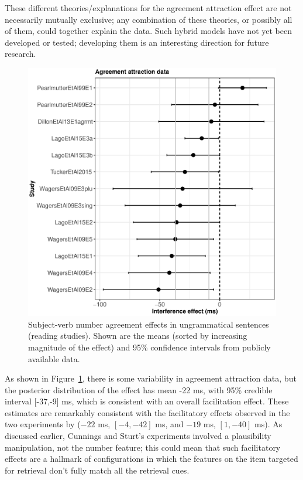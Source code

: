 \documentclass{cambridge7A}\usepackage[]{graphicx}\usepackage[]{color}
\makeatletter
\def\maxwidth{ %
  \ifdim\Gin@nat@width>\linewidth
    \linewidth
  \else
    \Gin@nat@width
  \fi
}
\newenvironment{knitrout}{}{} %
\makeatother
\begin{document}
 These different theories/explanations for the agreement attraction effect are not necessarily mutually exclusive; any combination of these theories, or possibly all of them, could together explain the data. Such hybrid models have not yet been developed or tested; developing them is an interesting direction for future research.
  


\begin{figure}[!htbp]
\centering
\begin{knitrout}
\color{fgcolor}

{\centering \includegraphics[width=\maxwidth]{figures/fig-mismatchplot-1} 

}



\end{knitrout}
\caption{Subject-verb number agreement effects in ungrammatical sentences (reading studies). Shown are the means (sorted by increasing magnitude of the effect) and 95\% confidence intervals from publicly available data.}\label{fig:agrmtattrnc01}
\end{figure} 

 As shown in Figure~\ref{fig:agrmtattrnc01}, there is some variability in agreement attraction data, but the posterior distribution of the effect has mean -22 ms, with 95\% credible interval [-37,-9] ms, which is consistent with an overall facilitation effect. These estimates are remarkably consistent with the facilitatory effects observed in the two experiments by \cite{CunningsSturt2018} ($-22$ ms, $[-4,-42]$ ms,  and $-19$ ms, $[1,-40]$ ms). As discussed earlier, Cunnings and Sturt's experiments involved a plausibility manipulation, not the number feature; this could mean that such facilitatory effects are a hallmark of configurations in which the features on the item targeted for retrieval don't fully match all the retrieval cues.
\end{document}
